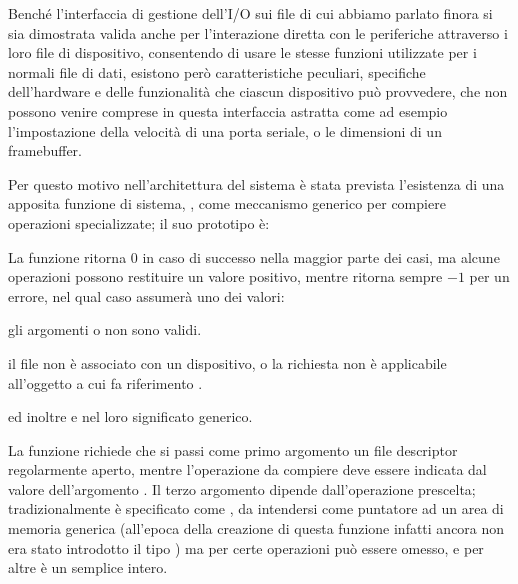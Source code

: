 
Benché l'interfaccia di gestione dell'I/O sui file di cui abbiamo parlato
finora si sia dimostrata valida anche per l'interazione diretta con le
periferiche attraverso i loro file di dispositivo, consentendo di usare le
stesse funzioni utilizzate per i normali file di dati, esistono però
caratteristiche peculiari, specifiche dell'hardware e delle funzionalità che
ciascun dispositivo può provvedere, che non possono venire comprese in questa
interfaccia astratta come ad esempio l'impostazione della velocità di una
porta seriale, o le dimensioni di un framebuffer.

Per questo motivo nell'architettura del sistema è stata prevista l'esistenza
di una apposita funzione di sistema, , come meccanismo generico
per compiere operazioni specializzate; il suo prototipo è:

\begin{funcproto}{
}

{La funzione ritorna $0$ in caso di successo nella maggior parte dei casi, ma
  alcune operazioni possono restituire un valore positivo, mentre ritorna
  sempre $-1$ per un errore, nel qual caso  assumerà uno dei
  valori:
  \begin{errlist}
  \item[\errcode{EINVAL}] gli argomenti  o  non sono
    validi.
  \item[\errcode{ENOTTY}] il file  non è associato con un
    dispositivo, o la richiesta non è applicabile all'oggetto a cui fa
    riferimento .
  \end{errlist}
  ed inoltre  e  nel loro significato generico.}
\end{funcproto}


La funzione richiede che si passi come primo argomento un file
descriptor  regolarmente aperto, mentre l'operazione da compiere
deve essere indicata dal valore dell'argomento . Il terzo
argomento dipende dall'operazione prescelta; tradizionalmente è specificato
come , da intendersi come puntatore ad un area di memoria
generica (all'epoca della creazione di questa funzione infatti ancora non era
stato introdotto il tipo ) ma per certe operazioni può essere
omesso, e per altre è un semplice intero.

